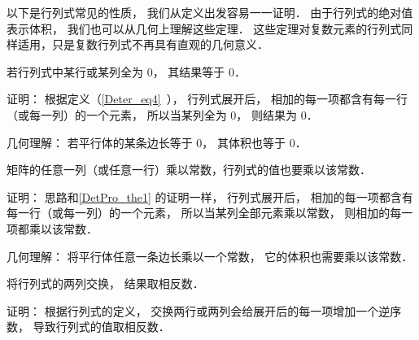 


以下是行列式常见的性质， 我们从定义出发容易一一证明． 由于行列式的绝对值表示体积， 我们也可以从几何上理解这些定理． 这些定理对复数元素的行列式同样适用，只是复数行列式不再具有直观的几何意义．

\begin{theorem}{ } \label{DetPro_the1}
若行列式中某行或某列全为 0， 其结果等于 0．
\end{theorem}
证明： 根据定义（\autoref{Deter_eq4}~）， 行列式展开后， 相加的每一项都含有每一行（或每一列）的一个元素， 所以当某列全为 0， 则结果为 0．

几何理解： 若平行体的某条边长等于 0， 其体积也等于 0．

\begin{theorem}{ } \label{DetPro_the3}
矩阵的任意一列（或任意一行）乘以常数，行列式的值也要乘以该常数．
\end{theorem}
证明： 思路和\autoref{DetPro_the1} 的证明一样， 行列式展开后， 相加的每一项都含有每一行（或每一列）的一个元素， 所以当某列全部元素乘以常数， 则相加的每一项都乘以该常数．

几何理解： 将平行体任意一条边长乘以一个常数， 它的体积也需要乘以该常数．

\begin{theorem}{ }\label{DetPro_the6}
将行列式的两列交换， 结果取相反数．
\end{theorem}
证明： 根据行列式的定义， 交换两行或两列会给展开后的每一项增加一个逆序数， 导致行列式的值取相反数．

